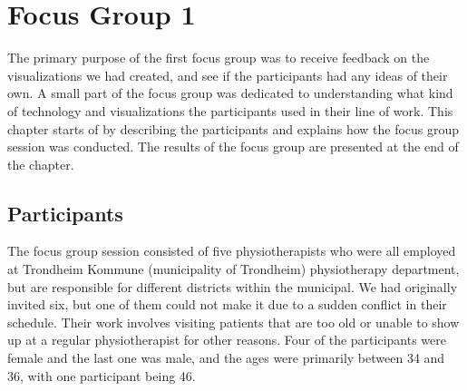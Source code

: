 \chapter{Focus Group 1}
\label{ch:focusGroup1}
The primary purpose of the first focus group was to receive feedback on the visualizations we had created, and see if the participants had any ideas of their own. A small part of the focus group was dedicated to understanding what kind of technology and visualizations the participants used in their line of work. This chapter starts of by describing the participants and explains how the focus group session was conducted. The results of the focus group are presented at the end of the chapter.

\section{Participants}
The focus group session consisted of five physiotherapists who were all employed at Trondheim Kommune (municipality of Trondheim) physiotherapy department, but are responsible for different districts within the municipal. We had originally invited six, but one of them could not make it due to a sudden conflict in their schedule. Their work involves visiting patients that are too old or unable to show up at a regular physiotherapist for other reasons. Four of the participants were female and the last one was male, and the ages were primarily between 34 and 36, with one participant being 46. 


%
%

